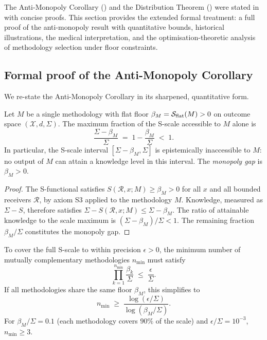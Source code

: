 The Anti-Monopoly Corollary () and the Distribution
Theorem () were stated in 
with concise proofs.  This section provides the extended formal treatment:
a full proof of the anti-monopoly result with quantitative bounds, historical
illustrations, the medical interpretation, and the optimisation-theoretic
analysis of methodology selection under floor constraints.

\subsection{Formal proof of the Anti-Monopoly Corollary}

We re-state the Anti-Monopoly Corollary in its sharpened, quantitative form.

\begin{theorem}
\label{thm:ch02-anti-monopoly-quant}
Let $M$ be a single methodology with flat floor $\beta_M =
\mathcal{S}_{\mathrm{flat}}(M) > 0$ on outcome space $(\mathcal{X}, d, \Sigma)$.
The maximum fraction of the S-scale accessible to $M$ alone is
\[
  \frac{\Sigma - \beta_M}{\Sigma} \;=\; 1 - \frac{\beta_M}{\Sigma} \;<\; 1.
\]
In particular, the S-scale interval $[\Sigma - \beta_M, \Sigma]$ is
epistemically inaccessible to $M$: no output of $M$ can attain a knowledge
level in this interval.  The \emph{monopoly gap} is $\beta_M > 0$.
\end{theorem}

\begin{proof}
The S-functional satisfies $S(\mathcal{R}, x; M) \geq \beta_M > 0$ for all
$x$ and all bounded receivers $\mathcal{R}$, by axiom S3 applied to the
methodology $M$.  Knowledge, measured as $\Sigma - S$, therefore satisfies
$\Sigma - S(\mathcal{R}, x; M) \leq \Sigma - \beta_M$.  The ratio of
attainable knowledge to the scale maximum is
$(\Sigma - \beta_M)/\Sigma < 1$.  The remaining fraction $\beta_M/\Sigma$
constitutes the monopoly gap.
\end{proof}

\begin{corollary}
\label{cor:ch02-min-diversity}
To cover the full S-scale to within precision $\epsilon > 0$, the minimum
number of mutually complementary methodologies $n_{\mathrm{min}}$ must
satisfy
\[
  \prod_{k=1}^{n_{\mathrm{min}}} \frac{\beta_k}{\Sigma}
  \;\leq\;
  \frac{\epsilon}{\Sigma}.
\]
If all methodologies share the same floor $\beta_M$, this simplifies to
\[
  n_{\mathrm{min}} \;\geq\; \frac{\log(\epsilon/\Sigma)}{\log(\beta_M/\Sigma)}.
\]
For $\beta_M/\Sigma = 0.1$ (each methodology covers $90\%$ of the scale)
and $\epsilon/\Sigma = 10^{-3}$, $n_{\mathrm{min}} \geq 3$.
\end{corollary}

